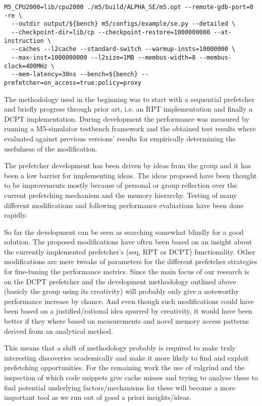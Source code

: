 \documentclass[12pt,journal,compsoc]{IEEEtran}
\begin{document}
\begin{verbatim}
M5_CPU2000=lib/cpu2000 ./m5/build/ALPHA_SE/m5.opt --remote-gdb-port=0 -re \
  --outdir output/${bench} m5/configs/example/se.py --detailed \
  --checkpoint-dir=lib/cp --checkpoint-restore=1000000000 --at-instruction \
  --caches --l2cache --standard-switch --warmup-insts=10000000 \
  --max-inst=1000000000 --l2size=1MB --membus-width=8 --membus-clock=400MHz \
  --mem-latency=30ns --bench=${bench} --prefetcher=on_access=true:policy=proxy
\end{verbatim}

The methodology used in the beginning was to start with a sequential
prefetcher and briefly progress through prior art, i.e. an RPT implementation
and finally a DCPT implementation. During development the performance was
measured by running a M5-simulator testbench framework and the obtained test
results where evaluated against previous versions' results for
empirically determining the usefulness of the modification.

The prefetcher development has been driven by ideas from the group and it
has been a low barrier for implementing ideas. The ideas proposed have been
thought to be improvements mostly because of personal or group reflection over
the current prefetching mechanism and the memory hierarchy. Testing of
many different modifications and following performance evaluations have been
done rapidly.

So far the development can be seen as searching somewhat blindly for a good
solution. The proposed modifications have often been based on an insight
about the currently implemented prefetcher's (seq, RPT or DCPT) functionality.
Other modifications are mere tweaks of parameters for the different prefetcher
strategies for fine-tuning the performance metrics. Since the main focus of
our research is on the DCPT prefetcher and the development methodology
outlined above (basicly the group using its creativity) will probably only
give a noteworthy performance increase by chance. And even though such
modifications could have been based on a justified/rational idea spurred by
creativity, it would have been better if they where based on measurements and
novel memory access patterns derived from an analytical method.

This means that a shift of methodology probably is required to make truly
interesting discoveries academically and make it more likely to find and
exploit prefetching opportunities. For the remaining work the use of valgrind
and the inspection of which code snippets give cache misses and trying to
analyse these to find potential underlying factors/mechanisms for these
will become a more important tool as we run out of good a priori
insights/ideas.
\end{document}
